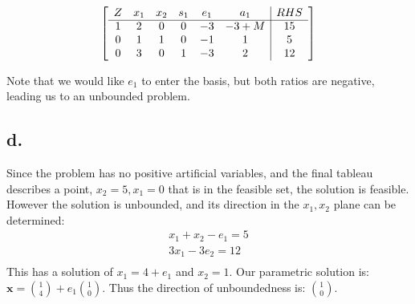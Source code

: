 \documentclass[10pt, letterpaper]{paper}
\begin{document}
\[
	\left[ {\begin{array}{cccccc|c}
	Z & x_1 & x_2 & s_1 & e_1 & a_1 & RHS\\ \cline{1-7}
	1 & 2 & 0 & 0 & -3 & -3 + M & 15 \\
	0 & 1 & 1 & 0 & -1 & 1 & 5\\
	0 & 3 & 0 & 1 & -3 & 2 & 12\\
	\end{array} } \right]
\]

Note that we would like $e_1$ to enter the basis, but both ratios are negative, leading us to an unbounded problem.

\subsection*{d.}
Since the problem has no positive artificial variables, and the final tableau describes a point, $x_2 =5, x_1 = 0$ that is in the feasible set, the solution is feasible.
\newline
However the solution is unbounded, and its direction in the $x_1,x_2$ plane can be determined:
\begin{eqnarray*}
x_1 + x_2 - e_1 = 5 \\
3x_1 - 3e_2 = 12 \\
\end{eqnarray*}
This has a solution of $x_1 = 4 + e_1$ and $x_2 = 1$.
Our parametric solution is: $\textbf{x} = {1 \choose 4} + e_1 { 1 \choose 0 }$.
\newline
Thus the direction of unboundedness is: ${1 \choose 0 }$.
\end{document}

